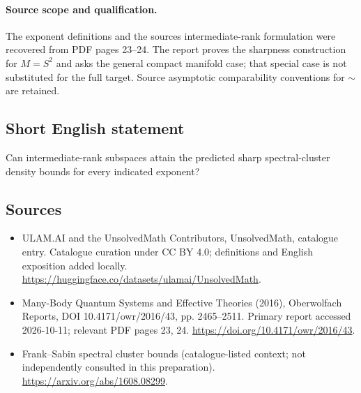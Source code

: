\documentclass[11pt]{article}
\begin{document}
\paragraph{Source scope and qualification.}
The exponent definitions and the source\textquotesingle s intermediate-rank formulation were recovered from PDF pages 23--24. The report proves the sharpness construction for $M=S^2$ and asks the general compact manifold case; that special case is not substituted for the full target. Source asymptotic comparability conventions for $\sim$ are retained.
\subsection{Short English statement}
Can intermediate-rank subspaces attain the predicted sharp spectral-cluster density bounds for every indicated exponent?
\subsection{Sources}
\begin{itemize}
\item[\hypertarget{source:statement:1}{S1}] ULAM.AI and the UnsolvedMath Contributors, UnsolvedMath, catalogue entry. Catalogue curation under CC BY 4.0; definitions and English exposition added locally.
\url{https://huggingface.co/datasets/ulamai/UnsolvedMath}.
\item[\hypertarget{source:statement:2}{S2}] Many-Body Quantum Systems and Effective Theories (2016), Oberwolfach Reports, DOI 10.4171/owr/2016/43, pp. 2465--2511. Primary report accessed 2026-10-11; relevant PDF pages 23, 24.
\url{https://doi.org/10.4171/owr/2016/43}.
\item[\hypertarget{source:statement:3}{S3}] Frank--Sabin spectral cluster bounds (catalogue-listed context; not independently consulted in this preparation).
\url{https://arxiv.org/abs/1608.08299}.
\end{itemize}
\label{end:statement}
\end{document}
